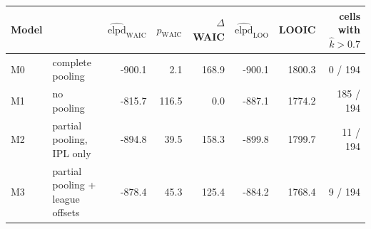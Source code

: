 \begin{tabular}{llrrrrrr}
\toprule
Model & & $\widehat{\mathrm{elpd}}_{\mathrm{WAIC}}$ & $p_{\mathrm{WAIC}}$ & $\Delta$WAIC & $\widehat{\mathrm{elpd}}_{\mathrm{LOO}}$ & LOOIC & cells with $\hat k>0.7$ \\
\midrule
M0 & complete pooling & -900.1 & 2.1 & 168.9 & -900.1 & 1800.3 & 0 / 194 \\
M1 & no pooling & -815.7 & 116.5 & 0.0 & -887.1 & 1774.2 & 185 / 194 \\
M2 & partial pooling, IPL only & -894.8 & 39.5 & 158.3 & -899.8 & 1799.7 & 11 / 194 \\
M3 & partial pooling + league offsets & -878.4 & 45.3 & 125.4 & -884.2 & 1768.4 & 9 / 194 \\
\bottomrule
\end{tabular}